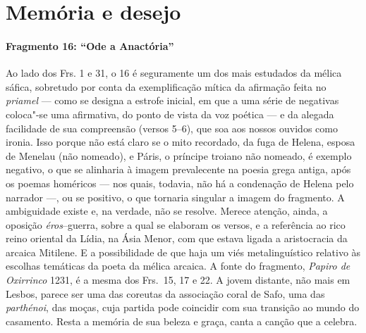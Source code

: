 \section{Memória e desejo}

\paragraph{Fragmento 16: ``Ode a Anactória''}

{\small Ao lado dos Frs. 1 e 31, o 16 é seguramente um dos mais estudados da mélica
sáfica, sobretudo por conta da exemplificação mítica da afirmação feita no
\textit{priamel} --- como se designa a estrofe inicial, em que a uma série de
negativas coloca"-se uma afirmativa, do ponto de vista da voz poética --- e da
alegada facilidade de sua compreensão (versos 5--6), que soa aos nossos ouvidos
como ironia. Isso porque não está claro se o mito recordado, da fuga de Helena, esposa 
de Menelau (não nomeado), e Páris, o príncipe troiano não nomeado, é exemplo
negativo, o que se alinharia à imagem prevalecente na poesia grega antiga, após
os poemas homéricos --- nos quais, todavia, não há a condenação de Helena pelo
narrador ---, ou se positivo, o que tornaria singular a imagem do fragmento. A
ambiguidade existe e, na verdade, não se resolve. Merece atenção, ainda, a
oposição \textit{éros}--guerra, sobre a qual se elaboram os versos, e a
referência ao rico reino oriental da Lídia, na Ásia Menor, com que estava
ligada a aristocracia da arcaica Mitilene. E a possibilidade de que haja um
viés metalinguístico relativo às escolhas temáticas da poeta da mélica arcaica.
A fonte do fragmento, \textit{Papiro de Oxirrinco} 1231, é a mesma dos Frs.~15, 17 e 22.
A jovem distante, não mais em Lesbos, parece ser uma das coreutas da associação coral de Safo, uma das \textit{parthénoi}, das moças, cuja partida pode coincidir com sua transição ao mundo do casamento. Resta a memória de sua beleza e graça, canta a canção que a celebra.}

